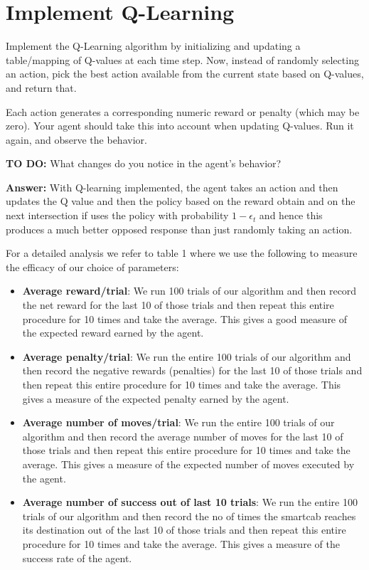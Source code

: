 \documentclass{article}
\begin{document}
\section{Implement Q-Learning}

Implement the Q-Learning algorithm by initializing and updating a table/mapping of Q-values at each time step. Now, instead of randomly selecting an action, pick the best action available from the current state based on Q-values, and return that.

Each action generates a corresponding numeric reward or penalty (which may be zero). Your agent should take this into account when updating Q-values. Run it again, and observe the behavior.

\vspace{.5cm}

\noindent\textbf{TO DO:} What changes do you notice in the agent’s behavior?

\vspace{.2cm}

\noindent\textbf{Answer:} With Q-learning implemented, the agent takes an action and then updates the Q value and then the policy based on the reward obtain and on the next intersection if uses the policy with probability $1-\epsilon_t$ and hence this produces a much better opposed response than just randomly taking an action.

For a detailed analysis we refer to table 1 where we use the following to measure the efficacy of our choice of parameters:
\begin{itemize}
\item \textbf{Average reward/trial}: We run 100 trials of our algorithm and then record the net reward for the last 10 of those trials and then repeat this entire procedure for 10 times and take the average. This gives a good measure of the expected reward earned by the agent.
\item \textbf{Average penalty/trial}: We run the entire 100 trials of our algorithm and then record the negative rewards (penalties) for the last 10 of those trials and then repeat this entire procedure for 10 times and take the average. This gives a measure of the expected penalty earned by the agent.
\item \textbf{Average number of moves/trial}: We run the entire 100 trials of our algorithm and then record the average number of moves for the last 10 of those trials and then repeat this entire procedure for 10 times and take the average. This gives a measure of the expected number of moves executed by the agent.
\item \textbf{Average number of success out of last 10 trials}: We run the entire 100 trials of our algorithm and then record the no of times the smartcab reaches its destination out of the last 10 of those trials and then repeat this entire procedure for 10 times and take the average. This gives a measure of the success rate of the agent.
\end{itemize}  
\end{document}
